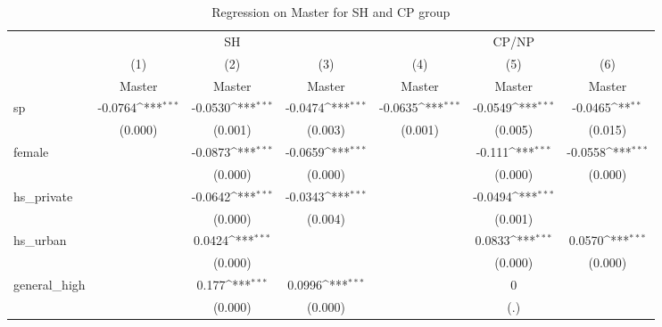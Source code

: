 \documentclass[]{AEA}
\def\sym#1{\ifmmode^{#1}\else\(^{#1}\)\fi}
\begin{document}
    \begin{center}
    \begin{table}
    \caption{Regression on Master for SH and CP group}
    \setlength{\tabcolsep}{0.5mm}
    \begin{tabular}{l*{6}c}
    \toprule
    &\multicolumn{3}{c}{SH} &\multicolumn{3}{c}{CP/NP} \\
    \cmidrule(l){2-4}\cmidrule(l){5-7}
    &\multicolumn{1}{c}{(1)}&\multicolumn{1}{c}{(2)}&\multicolumn{1}{c}{(3)}&\multicolumn{1}{c}{(4)}&\multicolumn{1}{c}{(5)}&\multicolumn{1}{c}{(6)} \\
    &\multicolumn{1}{c}{Master}&\multicolumn{1}{c}{Master}&\multicolumn{1}{c}{Master}&\multicolumn{1}{c}{Master}&\multicolumn{1}{c}{Master}&\multicolumn{1}{c}{Master} \\
    \midrule
    sp          &     -0.0764\sym{***}&     -0.0530\sym{***}&     -0.0474\sym{***}&     -0.0635\sym{***}&     -0.0549\sym{***}&     -0.0465\sym{**} \\
        &     (0.000)         &     (0.001)         &     (0.003)         &     (0.001)         &     (0.005)         &     (0.015)         \\
    [1em]
    female      &                     &     -0.0873\sym{***}&     -0.0659\sym{***}&                     &      -0.111\sym{***}&     -0.0558\sym{***}\\
        &                     &     (0.000)         &     (0.000)         &                     &     (0.000)         &     (0.000)         \\
    [1em]
    hs\_private  &                     &     -0.0642\sym{***}&     -0.0343\sym{***}&                     &     -0.0494\sym{***}&                     \\
        &                     &     (0.000)         &     (0.004)         &                     &     (0.001)         &                     \\
    [1em]
    hs\_urban    &                     &      0.0424\sym{***}&                     &                     &      0.0833\sym{***}&      0.0570\sym{***}\\
        &                     &     (0.000)         &                     &                     &     (0.000)         &     (0.000)         \\
    [1em]
    general\_high&                     &       0.177\sym{***}&      0.0996\sym{***}&                     &           0         &                     \\
        &                     &     (0.000)         &     (0.000)         &                     &         (.)         &                     \\

\end{tabular}
\end{table}
\end{center}
\end{document}
